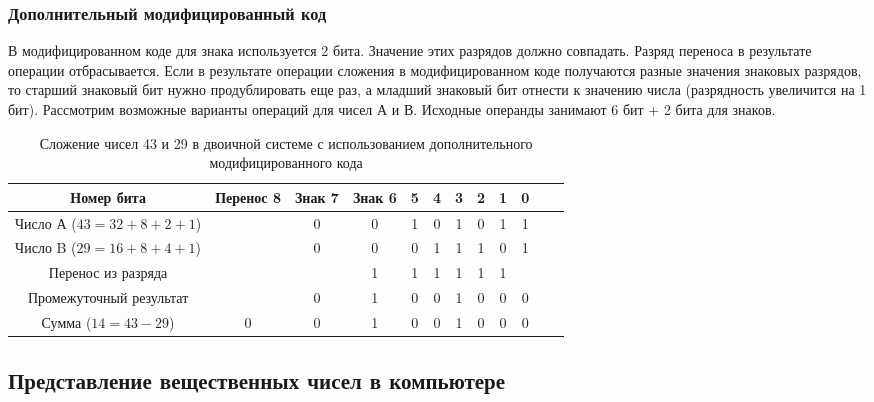 \documentclass[a4paper]{article}
\begin{document}
\subsubsection{Дополнительный модифицированный код}

В модифицированном коде для знака используется 2 бита. Значение этих разрядов должно совпадать. Разряд переноса в результате операции отбрасывается. Если в результате операции сложения в модифицированном коде получаются разные значения знаковых разрядов, то старший знаковый бит нужно продублировать еще раз, а младший знаковый бит отнести к значению числа (разрядность увеличится на 1 бит). Рассмотрим возможные варианты операций для чисел А и В. Исходные операнды занимают 6 бит + 2 бита для знаков.

\begin{table}\label{table:sub}
  \caption{Сложение чисел 43 и 29 в двоичной системе с использованием дополнительного модифицированного кода}
      \begin{center}
      \begin{tabular}{c * {11} {c}}
        \toprule
        Номер бита & Перенос 8 & \cellcolor{lightRed} Знак 7 & \cellcolor{lightRed}Знак 6 & 5 & 4 & 3 & 2 & 1 & 0 \\
        \toprule
        Число А ($43 = 32 + 8 + 2 + 1$) &  & \cellcolor{lightRed} 0 & \cellcolor{lightRed} 0 & 1 & 0 & 1 & 0 & 1 & 1\\
        \midrule
        Число B ($29 = 16 + 8 + 4 + 1$) &  & \cellcolor{lightRed} 0 & \cellcolor{lightRed} 0 & 0 & 1 & 1 & 1 & 0 & 1\\
        \midrule
        Перенос из разряда &  &  & 1 & 1 & 1 & 1 & 1 & 1 & \\
        \midrule
        Промежуточный результат &  &\cellcolor{lightRed} 0 & \cellcolor{lightRed}1 & 0 & 0 & 1 & 0 & 0 & 0\\
        \midrule
        Сумма ($14 = 43 - 29$) & \cellcolor{lightRed} 0 & \cellcolor{lightRed} 0 & 1 & 0 & 0 & 1 & 0 & 0 & 0 \\
        \midrule
      \end{tabular}
      \end{center}
    \end{table}


\subsection{Представление вещественных чисел в компьютере}
\end{document}
